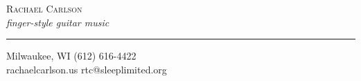 \documentclass[11pt,a4paper]{memoir}
\begin{document}
\begin{center}
\vspace*{1mm}
\textsc{\huge{Rachael Carlson}}\\
\emph{\tiny{finger-style guitar music}}
\vspace*{5mm}
\hrule
\vfill
\tiny{Milwaukee, WI \hfill (612) 616-4422} \\ 
\tiny{rachaelcarlson.us} \hfill \tiny{rtc@sleeplimited.org} %
\end{center}
\end{document}
